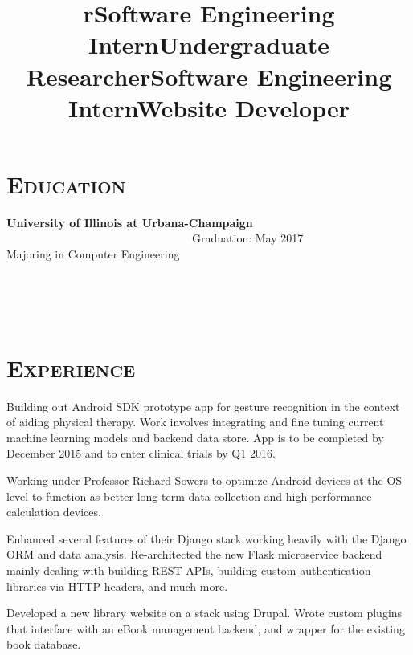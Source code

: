 \begin{resume}
\section{\textsc{Education}}
\textbf{University of Illinois at Urbana-Champaign} \ \ \ \ \ \ \ \ \ \ \ \ \ \ \ \ \ \ \ \ \ \ \ \ \ \ \ \ \ \ \ \ \ Graduation: May 2017 \\
Majoring in Computer Engineering
\begin{formatb}
  \title{r}\\
  \\
  \body\\
\end{formatb}

\section{\textsc{Experience}}

\title{Software Engineering Intern}
\begin{position}
Building out Android SDK prototype app for gesture recognition in the context of aiding physical therapy. Work involves integrating and fine tuning current machine learning models and backend data store. App is to be completed by December 2015 and to enter clinical trials by Q1 2016.
\end{position}

\title{Undergraduate Researcher}
\begin{position}
Working under Professor Richard Sowers to optimize Android devices at the OS level to function as better long-term data collection and high performance calculation devices.
\end{position}

\title{Software Engineering Intern}
\begin{position}
Enhanced several features of their Django stack working heavily with the Django ORM and data analysis. Re-architected the new Flask microservice backend mainly dealing with building REST APIs, building custom authentication libraries via HTTP headers, and much more.
\end{position}

\title{Website Developer}
\begin{position}
Developed a new library website on a stack using Drupal. Wrote custom plugins that interface with an eBook management backend, and wrapper for the existing book database.
\end{position}


\end{resume}
